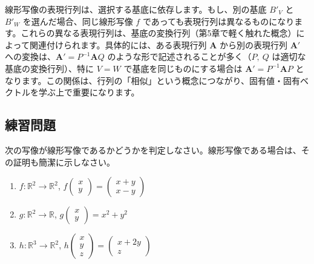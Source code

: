 \begin{rmk*}
線形写像の表現行列は、選択する基底に依存します。もし、別の基底 $B'_V$ と $B'_W$ を選んだ場合、同じ線形写像 $f$ であっても表現行列は異なるものになります。これらの異なる表現行列は、基底の変換行列（第5章で軽く触れた概念）によって関連付けられます。具体的には、ある表現行列 $\bm{A}$ から別の表現行列 $\bm{A}'$ への変換は、$\bm{A}' = P^{-1}\bm{A}Q$ のような形で記述されることが多く（$P,\ Q$ は適切な基底の変換行列）、特に $V=W$ で基底を同じものにする場合は $\bm{A}' = P^{-1}\bm{A}P$ となります。この関係は、行列の「相似」という概念につながり、固有値・固有ベクトルを学ぶ上で重要になります。
\end{rmk*}

\subsection{練習問題}

\begin{quiz}
次の写像が線形写像であるかどうかを判定しなさい。線形写像である場合は、その証明も簡潔に示しなさい。
\begin{enumerate}
\item $f: \mathbb{R}^2 \to \mathbb{R}^2$, $f\begin{pmatrix} x \\ y \end{pmatrix} = \begin{pmatrix} x+y \\ x-y \end{pmatrix}$
\item $g: \mathbb{R}^2 \to \mathbb{R}$, $g\begin{pmatrix} x \\ y \end{pmatrix} = x^2 + y^2$
\item $h: \mathbb{R}^3 \to \mathbb{R}^2$, $h\begin{pmatrix} x \\ y \\ z \end{pmatrix} = \begin{pmatrix} x+2y \\ z \end{pmatrix}$
\end{enumerate}
\end{quiz}

